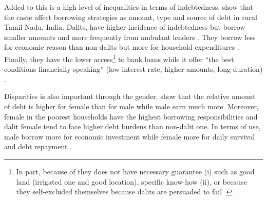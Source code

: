 \documentclass[a4paper, 11pt, onecolumn]{article}
\begin{document}

Added to this is a high level of inequalities in terms of indebtedness.
\cite{Guerin2013a} show that the caste affect borrowing strategies as amount, type and source of debt in rural Tamil Nadu, India.
Dalits, have higher incidence of indebtedness but borrow smaller amounts and more frequently from ambulant lenders \citep{Guerin2013a}.
They borrow less for economic reason than non-dalits but more for household expenditures \citep{Guerin2013a, Guerin2014a}.
Finally, they have the lower access\footnote{In part, because of they does not have necessary guarantee (i) such as good land (irrigated one and good location), specific know-how (ii), or because they self-excluded themselves because dalits are persuaded to fail \citep{Guerin2013a}.} to bank loans while it offer ``the best conditions financially speaking'' (low interest rate, higher amounts, long duration) \citep{Guerin2013a, Chavan2007}.

Disparities is also important through the gender.
\cite{Reboul2021} show that the relative amount of debt is higher for female than for male while male earn much more.
Moreover, female in the poorest households have the highest borrowing responsibilities and dalit female tend to face higher debt burdens than non-dalit one.
In terms of use, male borrow more for economic investment while female more for daily survival and debt repayment \citep{Reboul2021}.


\end{document}
